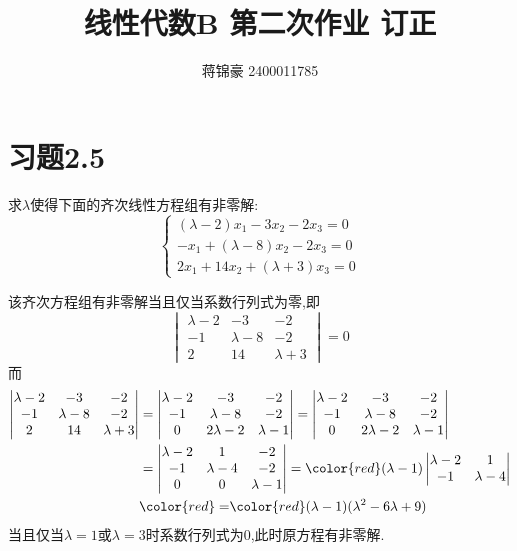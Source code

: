 \documentclass{ctexart}
\title{线性代数B  第二次作业 订正}
\author{蒋锦豪 2400011785}
\date{}
\begin{document}
\maketitle
\section*{习题2.5}
\begin{homework}[3]
    求$\lambda$使得下面的齐次线性方程组有非零解:
    \[\left\{\begin{array}{l}
        (\lambda-2)x_1-3x_2-2x_3=0\\
        -x_1+(\lambda-8)x_2-2x_3=0\\
        2x_1+14x_2+(\lambda+3)x_3=0
    \end{array}\right.\]
\end{homework}
\begin{solution}
    该齐次方程组有非零解当且仅当系数行列式为零,即
    \[\begin{vmatrix}
        \lambda-2&-3&-2\\
        -1&\lambda-8&-2\\
        2&14&\lambda+3
    \end{vmatrix}=0\]
    而
    \[\begin{aligned}
        \begin{vmatrix}
            \lambda-2&-3&-2\\
            -1&\lambda-8&-2\\
            2&14&\lambda+3
        \end{vmatrix}
        &= \begin{vmatrix}
                \lambda-2&-3&-2\\
                -1&\lambda-8&-2\\
                0&2\lambda-2&\lambda-1
            \end{vmatrix}=
            \begin{vmatrix}
                \lambda-2&-3&-2\\
                -1&\lambda-8&-2\\
                0&2\lambda-2&\lambda-1
            \end{vmatrix} \\
        &= \begin{vmatrix}
                \lambda-2&1&-2\\
                -1&\lambda-4&-2\\
                0&0&\lambda-1
            \end{vmatrix} = 
            {\color{red}(\lambda-1)\begin{vmatrix}
                \lambda-2&1\\
                -1&\lambda-4
            \end{vmatrix}} \\
        &{\color{red}=} {\color{red}(\lambda-1)(\lambda^2-6\lambda+9)}
    \end{aligned}\]
    当且仅当{\color{red}$\lambda=1$或$\lambda=3$}时系数行列式为$0$,此时原方程有非零解.
\end{solution}
\end{document}
